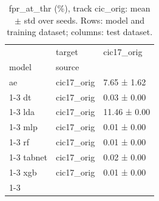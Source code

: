 \begin{table}
\caption{fpr_at_thr (\%), track cic_orig: mean $\pm$ std over seeds. Rows: model and training dataset; columns: test dataset.}
\label{tab:matrix_cic_orig_fpr_at_thr}
\begin{tabular}{lll}
\toprule
 & target & cic17_orig \\
model & source &  \\
\midrule
ae & cic17_orig & 7.65 ± 1.62 \\
\cline{1-3}
dt & cic17_orig & 0.03 ± 0.00 \\
\cline{1-3}
lda & cic17_orig & 11.46 ± 0.00 \\
\cline{1-3}
mlp & cic17_orig & 0.01 ± 0.00 \\
\cline{1-3}
rf & cic17_orig & 0.01 ± 0.00 \\
\cline{1-3}
tabnet & cic17_orig & 0.02 ± 0.00 \\
\cline{1-3}
xgb & cic17_orig & 0.01 ± 0.00 \\
\cline{1-3}
\bottomrule
\end{tabular}
\end{table}
